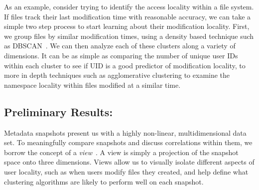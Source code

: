 As an example, consider trying to identify the access locality within a file
system. %
If files track their last modification time with
reasonable accuracy, we can take a simple two step process to start learning
about their modification locality. First, we group files by similar modification
times, using a density based technique such as DBSCAN~\cite{ester:kdd1996}. We
can then analyze each of these clusters along a variety of dimensions. It can be
as simple as comparing the number of unique user IDs within each cluster to see
if UID is a good predictor of modification locality, to more in depth techniques
such as agglomerative clustering to examine the namespace locality within files
modified at a similar time.
\subsection{Preliminary Results: }
Metadata snapshots present us with a highly non-linear, multidimensional
data set.  To meaningfully compare snapshots and discuss correlations within
them, we borrow the concept of a \textit{view}~\cite{mascotssnapshot}.  A view is simply a
projection of the snapshot space onto three dimensions.  Views allow us to
visually isolate different aspects of user locality, such as when users modify
files they created, and help define what clustering
algorithms are likely to perform well on each snapshot.

